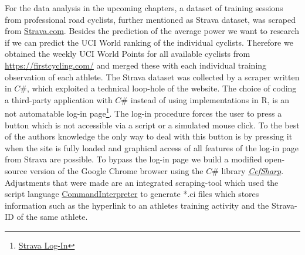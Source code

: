 \documentclass[12pt,a4paper]{article}
\let\rmarkdownfootnote\footnote%
\def\footnote{\protect\rmarkdownfootnote}
\begin{document}
For the data analysis in the upcoming chapters, a dataset of training sessions from professional road cyclists, further mentioned as Strava dataset, was scraped from \href{Strava.com}{Strava.com}. Besides the prediction of the average power we want to research if we can predict the UCI World ranking of the individual cyclists. Therefore we obtained the weekly UCI World Points for all available cyclists from \href{https://firstcycling.com/}{https://firstcycling.com/} and merged these with each individual training observation of each athlete. The Strava dataset was collected by a scraper written in \(C\#\), which exploited a technical loop-hole of the website. The choice of coding a third-party application with \(C\#\) instead of using implementations in R, is an not automatable log-in page\footnote{\href{https://www.Strava.com/login}{Strava Log-In}}. The log-in procedure forces the user to press a button which is not accessible via a script or a simulated mouse click. To the best of the authors knowledge the only way to deal with this button is by pressing it when the site is fully loaded and graphical access of all features of the log-in page from Strava are possible. To bypass the log-in page we build a modified open-source version of the Google Chrome browser using the \(C\#\) library \href{http://cefsharp.github.io/}{\textit{CefSharp}}. Adjustments that were made are an integrated scraping-tool which used the script language \href{https://git.petesplace.de/default/command-interpreter}{CommandInterpreter} to generate *.ci files which stores information such as the hyperlink to an athletes training activity and the Strava-ID of the same athlete.
\end{document}
